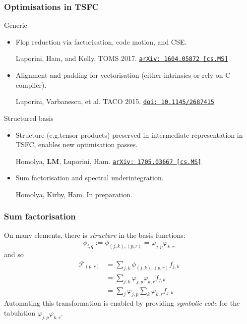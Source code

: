 \documentclass[presentation]{beamer}
\newcommand{\arxivlink}[2]{%
  \href{http://www.arxiv.org/abs/#1}%
  {\texttt{arXiv:\,#1\,[#2]}}%
}
\newcommand{\doilink}[1]{%
  \href{http://dx.doi.org/#1}%
  {\texttt{doi:\,#1}}%
}
\begin{document}
\begin{frame}
  \frametitle{Optimisations in TSFC}
  \begin{block}{Generic}
    \begin{itemize}
    \item Flop reduction via factorisation, code motion, and CSE.
      \begin{flushright}
        {\scriptsize
        Luporini, Ham, and Kelly.  TOMS
        2017. \arxivlink{1604.05872}{cs.MS}\nocite{Luporini:2017}}
      \end{flushright}
    \item Alignment and padding for vectorisation (either intrinsics
      or rely on C compiler).
      \begin{flushright}
        {\scriptsize
        Luporini, Varbanescu, et al. TACO
        2015. \doilink{10.1145/2687415}\nocite{Luporini:2015}}
      \end{flushright}
    \end{itemize}
  \end{block}
  \begin{block}{Structured basis}
    \begin{itemize}
    \item Structure (e.g.\@ tensor products) preserved in intermediate
      representation in TSFC, enables new optimisation passes.
      \begin{flushright}
        {\scriptsize Homolya, \textbf{LM}, Luporini, Ham. \arxivlink{1705.03667}{cs.MS}\nocite{Homolya:2017}}
      \end{flushright}
    \item Sum factorisation and spectral underintegration.
      \begin{flushright}
        {\scriptsize Homolya, Kirby, Ham. In preparation.}
      \end{flushright}
    \end{itemize}
  \end{block}
\end{frame}

\begin{frame}
  \frametitle{Sum factorisation}
  On many elements, there is \emph{structure} in the basis functions:
  \begin{equation*}
    \phi_{i,q} := \phi_{(j,k),(p,r)} = \varphi_{j,p}\varphi_{k,r}
  \end{equation*}
  and so
  \begin{align*}
    \mathcal{F}_{(p,r)} &= \sum_{j,k} \phi_{(j,k),(p,r)} f_{j,k} \\
                        &= \sum_{j,k} \varphi_{j,p}\varphi_{k,r} f_{j,k} \\
                        &= \sum_j \varphi_{j,p} \sum_k \varphi_{k,r} f_{j,k}
  \end{align*}
  Automating this transformation is enabled by providing
  \emph{symbolic code} for the tabulation
  $\varphi_{j,p}\varphi_{k,r}$.
\end{frame}
\end{document}
